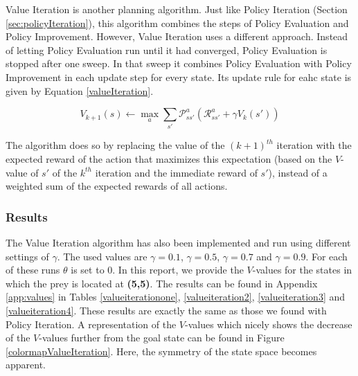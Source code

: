 \documentclass{article}
\begin{document}
Value Iteration is another planning algorithm. Just like Policy Iteration (Section \ref{sec:policyIteration}), this algorithm combines the steps of Policy Evaluation and Policy Improvement. However, Value Iteration uses a different approach. Instead of letting Policy Evaluation run until it had converged, Policy Evaluation is stopped after one sweep. In that sweep it combines Policy Evaluation with Policy Improvement in each update step for every state. Its update rule for eahc state is given by Equation \ref{valueIteration}.

\begin{equation}\label{valueIteration}
V_{k+1}(s) \leftarrow \max_a \sum_{s'} \mathcal P_{s s'}^{a} \left( \mathcal R_{s s'}^{a} + \gamma V_{k}(s') \right)
\end{equation}

The algorithm does so by replacing the value of the $(k+1)^{th}$ iteration with the expected reward of the action that maximizes this expectation (based on the $V$-value of $s' $ of the $k^{th}$ iteration and the immediate reward of $s' $), instead of a weighted sum of the expected rewards of all actions. 

\subsubsection{Results}\label{resultsValueIteration}
The Value Iteration algorithm has also been implemented and run using different settings of $\gamma$. The used values are $\gamma = 0.1$, $\gamma = 0.5$, $\gamma = 0.7$ and $\gamma = 0.9$. 
For each of these runs $\theta$ is set to 0. 
In this report, we provide the $V$-values for the states in which the prey is located at \textbf{(5,5)}. 
The results can be found in Appendix \ref{app:values} in Tables \ref{valueiterationone}, \ref{valueiteration2}, \ref{valueiteration3} and \ref{valueiteration4}. These results are exactly the same as those we found with Policy Iteration. 
A representation of the $V$-values which nicely shows the decrease of the $V$-values further from the goal state can be found in Figure \ref{colormapValueIteration}. Here, the symmetry of the state space becomes apparent.
\end{document}
